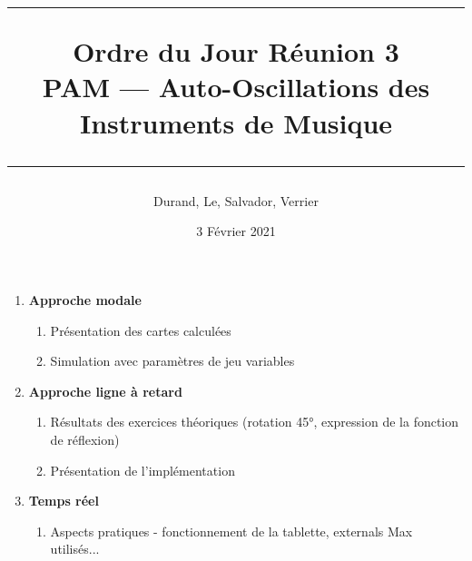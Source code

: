 \documentclass[a4paper, 11pt]{article}
\title{
	\noindent\rule{\linewidth}{0.4pt}
	\huge{Ordre du Jour Réunion 3\\}
	\medskip
	\Large{PAM --- Auto-Oscillations des Instruments de Musique}
	\noindent\rule{\linewidth}{1pt}
}
\author{Durand, Le, Salvador, Verrier}
\date{3 Février 2021}
\begin{document}
\maketitle


\begin{enumerate}
	\item \textbf{Approche modale}
	\begin{enumerate}
		\item Présentation des cartes calculées
		\item Simulation avec paramètres de jeu variables
	\end{enumerate}
	
	\item \textbf{Approche ligne à retard}
	\begin{enumerate}
		\item Résultats des exercices théoriques (rotation 45°, expression de la fonction de réflexion)
		\item Présentation de l'implémentation
	\end{enumerate}

	\item \textbf{Temps réel}
	\begin{enumerate}
		\item Aspects pratiques - fonctionnement de la tablette, externals Max utilisés...
	\end{enumerate}
		
\end{enumerate}
\end{document}
